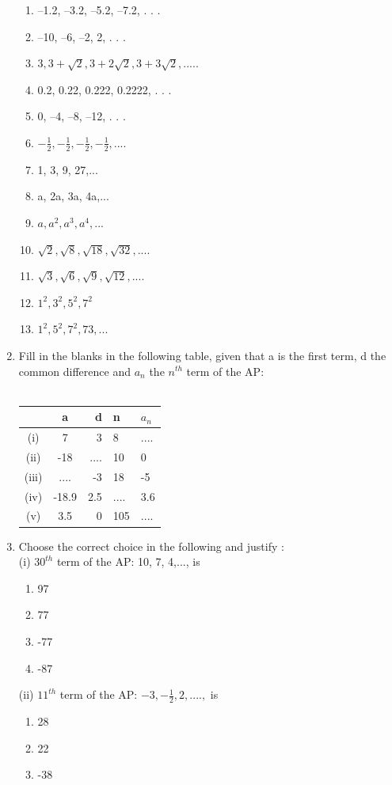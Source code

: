 \begin{enumerate}[label=\arabic*.,ref=\thesubsection.\theenumi]
\begin{enumerate}
\item –1.2, –3.2, –5.2, –7.2, . . .
\item –10, –6, –2, 2, . . .
\item $3,3+\sqrt{2}, 3+2\sqrt{2}, 3+3\sqrt{2},.....$
\item 0.2, 0.22, 0.222, 0.2222, . . .
\item 0, –4, –8, –12, . . .
\item $-\frac{1}{2}, -\frac{1}{2}, -\frac{1}{2}, -\frac{1}{2},....$
\item 1, 3, 9, 27,...
\item a, 2a, 3a, 4a,...
\item $a, a^2, a^3, a^4,...$
\item $\sqrt{2}, \sqrt{8}, \sqrt{18}, \sqrt{32},....$
\item $\sqrt{3}, \sqrt{6}, \sqrt{9}, \sqrt{12},....$
\item $1^2, 3^2, 5^2, 7^2$
\item $1^2, 5^2, 7^2, 73,...$
\end{enumerate}
\item Fill in the blanks in the following table, given that a is the first term, d the common
difference and $a_n$ the $n^{th}$ term of the AP:\\\\
\begin{tabular}{|c|c|r|l|l|}
\hline
&a& d & n & $a_n$\\
\hline
\hline
(i)& 7 &3 &8 &....\\
(ii)& -18 &.... &10  &0\\
(iii)& .... &-3 &18 &-5\\
(iv)& -18.9 &2.5 &.... &3.6\\
(v)& 3.5 &0 &105 &....\\
\hline
\end{tabular}
\item Choose the correct choice in the following and justify :\\
(i) $30^{th}$ term of the AP: 10, 7, 4,..., is
\begin{enumerate}
\item 97
\item 77
\item -77
\item -87
\end{enumerate}
(ii) $11^{th}$ term of the AP: $ -3, -\frac{1}{2}, 2,....,$ is 
\begin{enumerate}
\item 28
\item 22
\item -38

\end{enumerate}
\end{enumerate}

